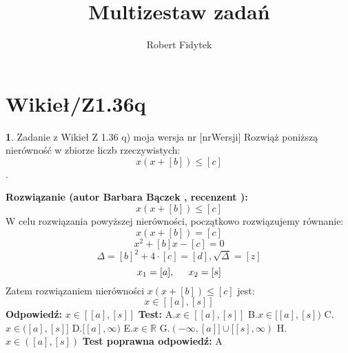 \documentclass[12pt, a4paper]{article}
\title{Multizestaw zadań}
\author{Robert Fidytek}
\date{}
\theoremstyle{definition} %
\newtheorem{zad}{}
\newcommand{\kategoria}[1]{\section{#1}} %
\newcommand{\zadStart}[1]{\begin{zad}#1\newline} %
\newcommand{\zadStop}{\end{zad}}   %
\newcommand{\rozwStart}[2]{\noindent \textbf{Rozwiązanie (autor #1 , recenzent #2): }\newline} %
\newcommand{\rozwStop}{\newline}                                            %
\newcommand{\odpStart}{\noindent \textbf{Odpowiedź:}\newline}    %
\newcommand{\odpStop}{\newline}                                             %
\newcommand{\testStart}{\noindent \textbf{Test:}\newline} %
\newcommand{\testStop}{\newline} %
\newcommand{\kluczStart}{\noindent \textbf{Test poprawna odpowiedź:}\newline} %
\newcommand{\kluczStop}{\newline} %
\begin{document}
\maketitle


\kategoria{Wikieł/Z1.36q}
\zadStart{Zadanie z Wikieł Z 1.36 q) moja wersja nr [nrWersji]}
Rozwiąż poniższą nierówność w zbiorze liczb rzeczywistych: 
$$x(x+[b]) \le [c]$$.
\zadStop
\rozwStart{Barbara Bączek}{}
$$x(x+[b]) \le [c] $$ 
W celu rozwiązania powyższej nierówności, początkowo rozwiązujemy równanie:
$$x(x+[b]) = [c]$$ 
$$x^2+[b]x -[c] = 0$$
$$\Delta= [b]^2 + 4\cdot[c]=[d], \sqrt{\Delta}=[z]$$
$$x_1=[a], \hspace{0.5cm} x_2=[s]$$
Zatem rozwiązaniem nierówności $x(x+[b]) \le [c] $ jest:
$$ x \in [[a],[s]]$$
\rozwStop
\odpStart
$x \in [[a],[s]]$
\odpStop
\testStart
A.$ x \in [[a],[s]]$
B.$ x \in [[a], [s])$
C.$ x \in ([a],[s]]$
D.$[[a], \infty)$
E.$ x \in \mathbb{R}$
G.$(-\infty, [a]] \cup [[s], \infty)$
H.$ x \in ([a],[s])$
\testStop
\kluczStart
A
\kluczStop
\end{document}
